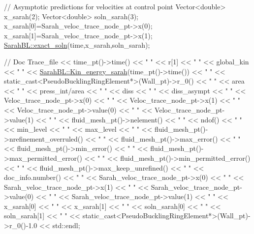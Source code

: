 \begin{DoxyCodeInclude}
{{{ \textcolor{comment}{// Asymptotic predictions for velocities at control point}
 Vector<double> x\_sarah(2);
 Vector<double> soln\_sarah(3);
 x\_sarah[0]=Sarah\_veloc\_trace\_node\_pt->x(0);
 x\_sarah[1]=Sarah\_veloc\_trace\_node\_pt->x(1);
 \hyperlink{namespaceoomph_1_1SarahBL_aa198aa1de07bb9a2eac422ed63010bc4}{SarahBL::exact\_soln}(time,x\_sarah,soln\_sarah);

 \textcolor{comment}{// Doc}
 Trace\_file << time\_pt()->time() 
            << \textcolor{stringliteral}{" "} << r[1]
            << \textcolor{stringliteral}{" "} << global\_kin 
            << \textcolor{stringliteral}{" "} << \hyperlink{namespaceoomph_1_1SarahBL_a3cb8715d5fa21d7dbff8151e90df4200}{SarahBL::Kin\_energy\_sarah}(time\_pt()->time()) 
            << \textcolor{stringliteral}{" "} << \textcolor{keyword}{static\_cast<}PseudoBucklingRingElement*\textcolor{keyword}{>}(Wall\_pt)->r\_0()
            << \textcolor{stringliteral}{" "} << area  
            << \textcolor{stringliteral}{" "} << press\_int/area 
            << \textcolor{stringliteral}{" "} << diss  
            << \textcolor{stringliteral}{" "} << diss\_asympt
            << \textcolor{stringliteral}{" "} << Veloc\_trace\_node\_pt->x(0)
            << \textcolor{stringliteral}{" "} << Veloc\_trace\_node\_pt->x(1) 
            << \textcolor{stringliteral}{" "} << Veloc\_trace\_node\_pt->value(0)
            << \textcolor{stringliteral}{" "} << Veloc\_trace\_node\_pt->value(1) 
            << \textcolor{stringliteral}{" "} << fluid\_mesh\_pt()->nelement() 
            << \textcolor{stringliteral}{" "} << ndof()
            << \textcolor{stringliteral}{" "} << min\_level 
            << \textcolor{stringliteral}{" "} << max\_level
            << \textcolor{stringliteral}{" "} << fluid\_mesh\_pt()->nrefinement\_overruled() 
            << \textcolor{stringliteral}{" "} << fluid\_mesh\_pt()->max\_error()  
            << \textcolor{stringliteral}{" "} << fluid\_mesh\_pt()->min\_error()  
            << \textcolor{stringliteral}{" "} << fluid\_mesh\_pt()->max\_permitted\_error() 
            << \textcolor{stringliteral}{" "} << fluid\_mesh\_pt()->min\_permitted\_error() 
            << \textcolor{stringliteral}{" "} << fluid\_mesh\_pt()->max\_keep\_unrefined()
            << \textcolor{stringliteral}{" "} << doc\_info.number()
            << \textcolor{stringliteral}{" "} << Sarah\_veloc\_trace\_node\_pt->x(0) 
            << \textcolor{stringliteral}{" "} << Sarah\_veloc\_trace\_node\_pt->x(1) 
            << \textcolor{stringliteral}{" "} << Sarah\_veloc\_trace\_node\_pt->value(0) 
            << \textcolor{stringliteral}{" "} << Sarah\_veloc\_trace\_node\_pt->value(1)
            << \textcolor{stringliteral}{" "} << x\_sarah[0]
            << \textcolor{stringliteral}{" "} << x\_sarah[1]
            << \textcolor{stringliteral}{" "} << soln\_sarah[0]
            << \textcolor{stringliteral}{" "} << soln\_sarah[1]
            << \textcolor{stringliteral}{" "} 
            << \textcolor{keyword}{static\_cast<}PseudoBucklingRingElement*\textcolor{keyword}{>}(Wall\_pt)->r\_0()-1.0
            << std::endl;


}}}
\end{DoxyCodeInclude}
